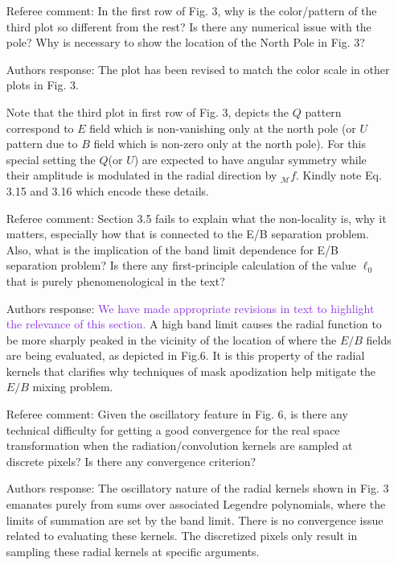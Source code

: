 \documentclass[12pt]{article}
\newcommand{\addtext}{\textcolor{BlueViolet}  }
\begin{document}
\begin{itemize}
\item[{Referee comment: }] In the first row of Fig. 3, why is the color/pattern of the third plot so different from the rest? Is there any numerical issue with the pole? Why is necessary to show the location of the North Pole in Fig. 3?

\item[{Authors response: }] The plot has been revised to match the color scale in other plots in Fig. 3. 

Note that the third plot in first row of Fig. 3, depicts the $Q$ pattern correspond to $E$ field which is non-vanishing only at the north pole (or $U$ pattern due to $B$ field which is non-zero only at the north pole). For this special setting the $Q$(or $U$) are expected to have angular symmetry while their amplitude is modulated in the radial direction by ${}_{\mathcal{M}}f$. Kindly note Eq. 3.15 and 3.16 which encode these details. 

\item[{Referee comment: }] Section 3.5 fails to explain what the non-locality is, why it matters, especially how that is connected to the E/B separation problem. Also, what is the implication of the band limit dependence for E/B separation problem? Is there any first-principle calculation of the value $\ell_0$ that is purely phenomenological in the text?

\item[{Authors response: }] \addtext{We have made appropriate revisions in text to highlight the relevance of this section.} A high band limit causes the radial function to be more sharply peaked in the vicinity of the location of where the $E/B$ fields are being evaluated, as depicted in Fig.6. It is this property of the radial kernels that  clarifies why techniques of mask apodization help mitigate the $E/B$ mixing problem.%

\item[{Referee comment: }] Given the oscillatory feature in Fig. 6, is there any technical difficulty for getting a good convergence for the real space transformation when the radiation/convolution kernels are sampled at discrete pixels? Is there any convergence criterion?
\item[{Authors response: }]  The oscillatory nature of the radial kernels shown in Fig. 3 emanates purely from sums over associated Legendre polynomials, where the limits of summation are set by the band limit. There is no convergence issue related to evaluating these kernels. The discretized pixels only result in sampling these radial kernels at specific arguments.


\end{itemize}
\end{document}
